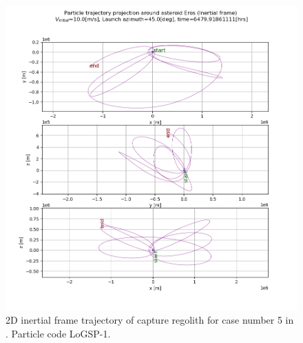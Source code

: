 \documentclass[print]{tudelft-report}
\begin{document}
\begin{appendices}
\begin{figure}[htb]
    \includegraphics[width=\textwidth, height=\textheight]{Results/Images/longest_edge_perturbations/3.2Density_1cmSize/2dTrajectory_10ms_45Azimuth_315solarPhase_inertialFrame.png}
    \caption{2D inertial frame trajectory of capture regolith for case number 5 in . Particle code LoGSP-1.}
    \label{fig:LoGSP_1_capture_case_5_2d_traj_inertialFrame}
    \end{figure}
    \FloatBarrier
    \begin{figure}[htb]
    \centering
    \captionsetup{justification=centering}

\end{figure}
\end{appendices}
\end{document}
